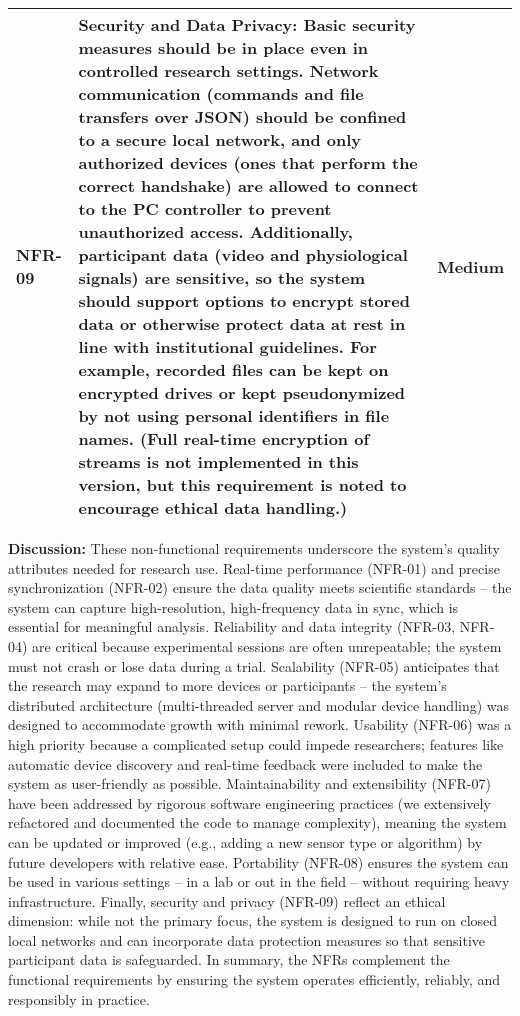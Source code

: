 \begin{table}[htbp]
\begin{tabular}{|p{1cm}|p{10cm}|c|}
\hline
NFR-09 & \textbf{Security and Data Privacy:} Basic security measures should be in place even in controlled research settings. Network communication (commands and file transfers over JSON) should be confined to a secure local network, and only authorized devices (ones that perform the correct handshake) are allowed to connect to the PC controller to prevent unauthorized access. Additionally, participant data (video and physiological signals) are sensitive, so the system should support options to encrypt stored data or otherwise protect data at rest in line with institutional guidelines. For example, recorded files can be kept on encrypted drives or kept pseudonymized by not using personal identifiers in file names. (Full real-time encryption of streams is not implemented in this version, but this requirement is noted to encourage ethical data handling.) & Medium \\
\hline
\end{tabular}
\end{table}

\textbf{Discussion:} These non-functional requirements underscore the system's quality attributes needed for research use. Real-time performance (NFR-01) and precise synchronization (NFR-02) ensure the data quality meets scientific standards -- the system can capture high-resolution, high-frequency data in sync, which is essential for meaningful analysis. Reliability and data integrity (NFR-03, NFR-04) are critical because experimental sessions are often unrepeatable; the system must not crash or lose data during a trial. Scalability (NFR-05) anticipates that the research may expand to more devices or participants -- the system's distributed architecture (multi-threaded server and modular device handling) was designed to accommodate growth with minimal rework. Usability (NFR-06) was a high priority because a complicated setup could impede researchers; features like automatic device discovery and real-time feedback were included to make the system as user-friendly as possible. Maintainability and extensibility (NFR-07) have been addressed by rigorous software engineering practices (we extensively refactored and documented the code to manage complexity), meaning the system can be updated or improved (e.g., adding a new sensor type or algorithm) by future developers with relative ease. Portability (NFR-08) ensures the system can be used in various settings -- in a lab or out in the field -- without requiring heavy infrastructure. Finally, security and privacy (NFR-09) reflect an ethical dimension: while not the primary focus, the system is designed to run on closed local networks and can incorporate data protection measures so that sensitive participant data is safeguarded. In summary, the NFRs complement the functional requirements by ensuring the system operates efficiently, reliably, and responsibly in practice.

